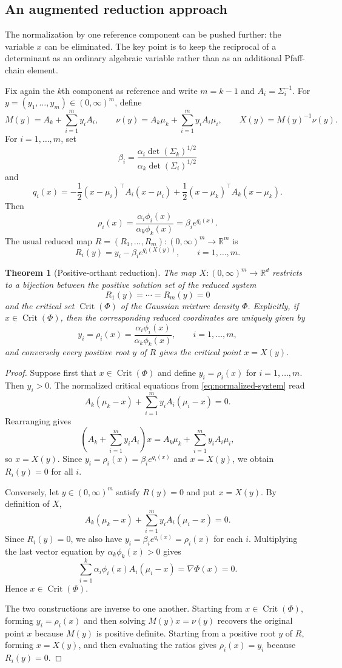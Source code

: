 \documentclass[11pt]{article}
\theoremstyle{plain}
\newtheorem{theorem}{Theorem}[section]
\theoremstyle{definition}
\theoremstyle{remark}
\numberwithin{equation}{section}
\DeclareMathOperator{\Crit}{Crit}
\newcommand{\R}{\mathbb{R}}
\begin{document}
\subsection[An augmented reduction approach]{An augmented reduction approach}\label{subsec:reduced-bound}

The normalization by one reference component can be pushed further: the variable $x$ can be eliminated. The key point is to keep the reciprocal of a determinant as an ordinary algebraic variable rather than as an additional Pfaff-chain element.

Fix again the $k$th component as reference and write $m=k-1$ and $A_i=\Sigma_i^{-1}$. For $y=(y_1,\dots,y_m)\in (0,\infty)^m$, define
\[
M(y)=A_k+\sum_{i=1}^m y_iA_i,
\qquad
\nu(y)=A_k\mu_k+\sum_{i=1}^m y_iA_i\mu_i,
\qquad
X(y)=M(y)^{-1}\nu(y).
\]
For $i=1,\dots,m$, set
\[
\beta_i=\frac{\alpha_i\det(\Sigma_k)^{1/2}}{\alpha_k\det(\Sigma_i)^{1/2}}
\]
and
\[
q_i(x)=-\frac12(x-\mu_i)^\top A_i(x-\mu_i)+\frac12(x-\mu_k)^\top A_k(x-\mu_k).
\]
Then
\[
\rho_i(x)=\frac{\alpha_i\phi_i(x)}{\alpha_k\phi_k(x)}=\beta_i e^{q_i(x)}.
\]
The usual reduced map $R=(R_1,\dots,R_m):(0,\infty)^m\to \R^m$ is
\[
R_i(y)=y_i-\beta_i e^{q_i(X(y))},\qquad i=1,\dots,m.
\]

\begin{theorem}[Positive-orthant reduction]\label{thm:reduction}
The map $X:(0,\infty)^m\to\R^d$ restricts to a bijection between the positive solution set of the reduced system
\[
R_1(y)=\cdots=R_m(y)=0
\]
and the critical set $\Crit(\Phi)$ of the Gaussian mixture density $\Phi$. Explicitly, if $x\in\Crit(\Phi)$, then the corresponding reduced coordinates are uniquely given by
\[
y_i=\rho_i(x)=\frac{\alpha_i\phi_i(x)}{\alpha_k\phi_k(x)},\qquad i=1,\dots,m,
\]
and conversely every positive root $y$ of $R$ gives the critical point $x=X(y)$.
\end{theorem}

\begin{proof}
Suppose first that $x\in\Crit(\Phi)$ and define $y_i=\rho_i(x)$ for $i=1,\dots,m$. Then $y_i>0$. The normalized critical equations from \eqref{eq:normalized-system} read
\[
A_k(\mu_k-x)+\sum_{i=1}^m y_iA_i(\mu_i-x)=0.
\]
Rearranging gives
\[
\left(A_k+\sum_{i=1}^m y_iA_i\right)x=A_k\mu_k+\sum_{i=1}^m y_iA_i\mu_i,
\]
so $x=X(y)$. Since $y_i=\rho_i(x)=\beta_i e^{q_i(x)}$ and $x=X(y)$, we obtain $R_i(y)=0$ for all $i$.

Conversely, let $y\in(0,\infty)^m$ satisfy $R(y)=0$ and put $x=X(y)$. By definition of $X$,
\[
A_k(\mu_k-x)+\sum_{i=1}^m y_iA_i(\mu_i-x)=0.
\]
Since $R_i(y)=0$, we also have $y_i=\beta_i e^{q_i(x)}=\rho_i(x)$ for each $i$. Multiplying the last vector equation by $\alpha_k\phi_k(x)>0$ gives
\[
\sum_{i=1}^k \alpha_i\phi_i(x)A_i(\mu_i-x)=\nabla\Phi(x)=0.
\]
Hence $x\in\Crit(\Phi)$.

The two constructions are inverse to one another. Starting from $x\in\Crit(\Phi)$, forming $y_i=\rho_i(x)$ and then solving $M(y)x=\nu(y)$ recovers the original point $x$ because $M(y)$ is positive definite. Starting from a positive root $y$ of $R$, forming $x=X(y)$, and then evaluating the ratios gives $\rho_i(x)=y_i$ because $R_i(y)=0$.
\end{proof}
\end{document}
